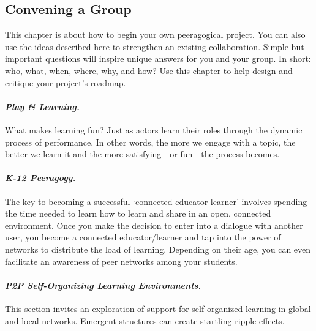 \hypertarget{convening-a-group}{%
\subsection{Convening a Group}\label{convening-a-group}}

This chapter is about how to begin your own peeragogical project. You
can also use the ideas described here to strengthen an existing
collaboration. Simple but important questions will inspire unique
answers for you and your group. In short: who, what, when, where, why,
and how? Use this chapter to help design and critique your project's
roadmap.

\hypertarget{play-learning.}{%
\paragraph{\texorpdfstring{\emph{Play \&
Learning.}}{Play \& Learning.}}\label{play-learning.}}

What makes learning fun? Just as actors learn their roles through the
dynamic process of performance, In other words, the more we engage with
a topic, the better we learn it and the more satisfying - or fun - the
process becomes.

\hypertarget{k-12-peeragogy.}{%
\paragraph{\texorpdfstring{\emph{K-12
Peeragogy.}}{K-12 Peeragogy.}}\label{k-12-peeragogy.}}

The key to becoming a successful `connected educator-learner' involves
spending the time needed to learn how to learn and share in an open,
connected environment. Once you make the decision to enter into a
dialogue with another user, you become a connected educator/learner and
tap into the power of networks to distribute the load of learning.
Depending on their age, you can even facilitate an awareness of peer
networks among your students.

\hypertarget{p2p-self-organizing-learning-environments.}{%
\paragraph{\texorpdfstring{\emph{P2P Self-Organizing Learning
Environments.}}{P2P Self-Organizing Learning Environments.}}\label{p2p-self-organizing-learning-environments.}}

This section invites an exploration of support for self-organized
learning in global and local networks. Emergent structures can create
startling ripple effects.

